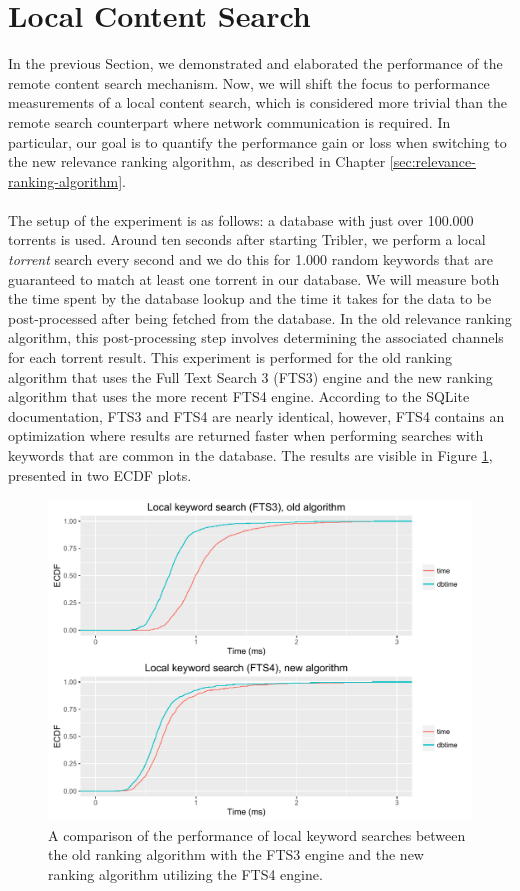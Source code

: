 \section{Local Content Search}
\label{sec:local-content-search}
In the previous Section, we demonstrated and elaborated the performance of the remote content search mechanism. Now, we will shift the focus to performance measurements of a local content search, which is considered more trivial than the remote search counterpart where network communication is required. In particular, our goal is to quantify the performance gain or loss when switching to the new relevance ranking algorithm, as described in Chapter \ref{sec:relevance-ranking-algorithm}.\\\\
The setup of the experiment is as follows: a database with just over 100.000 torrents is used. Around ten seconds after starting Tribler, we perform a local \emph{torrent} search every second and we do this for 1.000 random keywords that are guaranteed to match at least one torrent in our database. We will measure both the time spent by the database lookup and the time it takes for the data to be post-processed after being fetched from the database. In the old relevance ranking algorithm, this post-processing step involves determining the associated channels for each torrent result. This experiment is performed for the old ranking algorithm that uses the Full Text Search 3 (FTS3) engine and the new ranking algorithm that uses the more recent FTS4 engine. According to the SQLite documentation, FTS3 and FTS4 are nearly identical, however, FTS4 contains an optimization where results are returned faster when performing searches with keywords that are common in the database. The results are visible in Figure \ref{fig:local-search-fts3-fts4}, presented in two ECDF plots.\\

\begin{figure}[h!]
	\centering
	\includegraphics[width=1.0\columnwidth]{images/experiments/local_search_fts3_fts4}
	\caption{A comparison of the performance of local keyword searches between the old ranking algorithm with the FTS3 engine and the new ranking algorithm utilizing the FTS4 engine.}
	\label{fig:local-search-fts3-fts4}
\end{figure}

